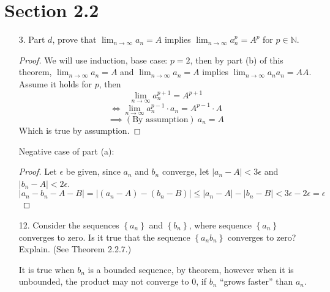 \documentclass[hidelinks,12pt]{article}
\renewcommand{\leq}{\leqslant}
\newcommand{\N}{\mathbb{N}}
\begin{document}
\section*{Section 2.2}
\begin{enumerate}
    \item[3.]Part $d$, prove that $\lim_{n\to\infty}a_n=A$ implies  $\lim_{n\to\infty}a_n^p=A^p$ for $p\in\N$.\begin{proof}
        We will use induction, base case: $p=2$, then by part (b) of this theorem, $\lim_{n\to\infty}a_n=A$ and $\lim_{n\to\infty}a_n=A$ implies $\lim_{n\to\infty}a_na_n=AA$.
        \newline Assume it holds for $p$, then $$\lim_{n\to\infty}a_n^{p+1}=A^{p+1}$$ $$\iff\lim_{n\to\infty}a_n^{p-1}\cdot a_n=A^{p-1}\cdot A$$ $$\implies(\text{By assumption})\ a_n=A$$ Which is true by assumption.
    \end{proof}Negative case of part (a):\begin{proof}
        Let $\epsilon$ be given, since $a_n$ and $b_n$ converge, let $|a_n-A|<3\epsilon$ and $|b_n-A|<2\epsilon$. $$|a_n-b_n-A-B|=|(a_n-A)-(b_n-B)|\leq|a_n-A|-|b_n-B|<3\epsilon-2\epsilon=\epsilon$$
    \end{proof}
    \item[12.]Consider the sequences $\left\{a_n\right\}$ and $\left\{b_n\right\}$, where sequence $\left\{a_n\right\}$ converges to zero. Is it true that the sequence $\left\{a_n b_n\right\}$ converges to zero? Explain. (See Theorem 2.2.7.)\par\null\par It is true when $b_n$ is a bounded sequence, by theorem, however when it is unbounded, the product may not converge to 0, if $b_n$ ``grows faster'' than $a_n$.
\end{enumerate}
\end{document}
